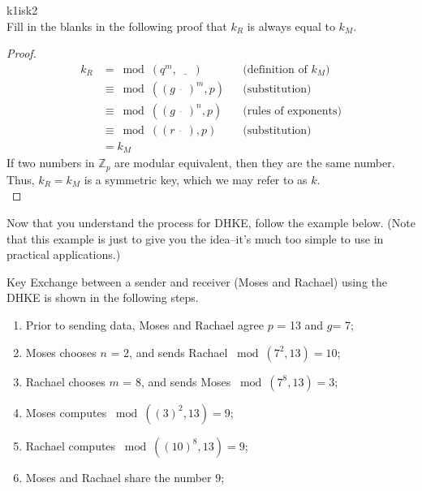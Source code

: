 \begin{exercise}{k1isk2}\\
Fill in the blanks in the following proof that  $k_R$ is always equal to  $k_M$.\\
  	\begin{proof} 
		\begin{align*} 
		k_R &=   \bmod (q^m , \underline{~~~~~~}) && \text{(definition of $k_M$)}
		\\&\equiv \bmod ((g^{\underline{~~~~~~}})^m , p) &&  \text{(substitution)}	
		\\&\equiv \bmod ((g^{\underline{~~~~~~}})^n , p) &&  \text{(rules of exponents)}
		\\&\equiv \bmod ((r^{\underline{~~~~~~}}) , p) &&  \text{(substitution)}		
		\\&= k_M
		\end{align*} 
   	If two numbers in $\mathbb{Z}_p$ are modular equivalent, then they are the same number. Thus, $k_R = k_M$ is a symmetric key, which we may refer to as $k$.\\

  	\end{proof}
\end{exercise}

Now that you understand the process for DHKE, follow the example below.  (Note that this example is just to give you the idea--it's much too simple to use in practical applications.)

 \begin{eg} Key Exchange between a sender and receiver (Moses and Rachael) using the DHKE is shown in the following steps.
\begin{enumerate}[Step 1.]
\item Prior to sending data, Moses and Rachael agree $p$ = 13 and $g$= 7; 
\item Moses chooses $n$ = 2, and sends Rachael $\bmod (7^2 , 13) = 10$;
\item Rachael chooses $m$ = 8, and sends Moses $\bmod (7^8  , 13) = 3 $;
\item Moses computes $\bmod ((3)^2 , 13 ) = 9$;
\item Rachael computes $\bmod ((10)^8 , 13 ) = 9$;
\item Moses and Rachael share the number 9;
\end{enumerate}
\end{eg}


